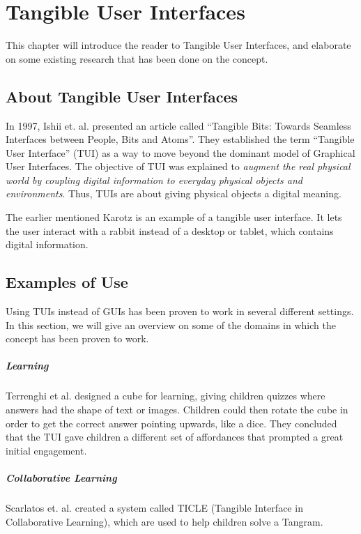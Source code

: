 \chapter{Tangible User Interfaces}
\label{chp:tangibleinterfaces}

This chapter will introduce the reader to Tangible User Interfaces, and elaborate on some existing research that has been done on the concept.   

\section{About Tangible User Interfaces}
\label{sec:abouttuis}

In 1997, Ishii et. al. presented an article called ``Tangible Bits: Towards Seamless Interfaces between People, Bits and Atoms''. They established the term ``Tangible User Interface'' (TUI) as a way to move beyond the dominant model of Graphical User Interfaces. The objective of TUI was explained to \emph{augment the real physical world by coupling digital information to everyday physical objects and environments}\cite{ishii1997tangible}. Thus, TUIs are about giving physical objects a digital meaning. 

The earlier mentioned Karotz is an example of a tangible user interface. It lets the user interact with a rabbit instead of a desktop or tablet, which contains digital information.        


\section{Examples of Use}
\label{sec:tuiexamples}
Using TUIs instead of GUIs has been proven to work in several different settings. In this section, we will give an overview on some of the domains in which the concept has been proven to work. 

\paragraph{Learning}
Terrenghi et al. designed a cube for learning, giving children quizzes where answers had the shape of text or images\cite{terrenghi2006cube}. Children could then rotate the cube in order to get the correct answer pointing upwards, like a dice. They concluded that the TUI gave children a different set of affordances that prompted a great initial engagement\cite{terrenghi2006cube}. 

\paragraph{Collaborative Learning}
Scarlatos et. al. created a system called TICLE (Tangible Interface in Collaborative Learning), which are used to help children solve a Tangram\cite{scarlatos1999ticle}.  

